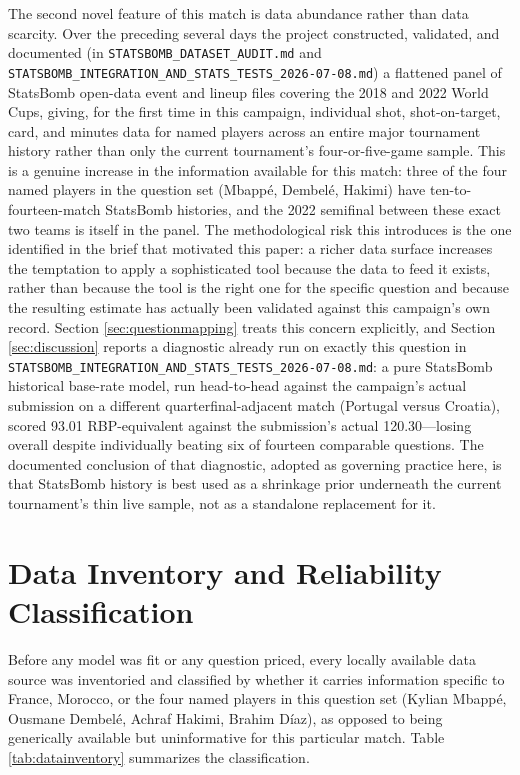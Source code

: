 \documentclass[11pt]{article}
\begin{document}
The second novel feature of this match is data abundance rather than data scarcity. Over
the preceding several days the project constructed, validated, and documented (in
\texttt{STATSBOMB\_DATASET\_AUDIT.md} and
\texttt{STATSBOMB\_INTEGRATION\_AND\_STATS\_TESTS\_2026-07-08.md}) a flattened panel of
StatsBomb open-data event and lineup files covering the 2018 and 2022 World Cups, giving,
for the first time in this campaign, individual shot, shot-on-target, card, and minutes
data for named players across an entire major tournament history rather than only the
current tournament's four-or-five-game sample. This is a genuine increase in the
information available for this match: three of the four named players in the question
set (Mbapp\'e, Dembel\'e, Hakimi) have ten-to-fourteen-match StatsBomb histories, and the
2022 semifinal between these exact two teams is itself in the panel. The methodological
risk this introduces is the one identified in the brief that motivated this paper: a
richer data surface increases the temptation to apply a sophisticated tool because the
data to feed it exists, rather than because the tool is the right one for the specific
question and because the resulting estimate has actually been validated against this
campaign's own record. Section \ref{sec:questionmapping} treats this concern explicitly,
and Section \ref{sec:discussion} reports a diagnostic already run on exactly this
question in \texttt{STATSBOMB\_INTEGRATION\_AND\_STATS\_TESTS\_2026-07-08.md}: a
pure StatsBomb historical base-rate model, run head-to-head against the campaign's actual
submission on a different quarterfinal-adjacent match (Portugal versus Croatia), scored
93.01 RBP-equivalent against the submission's actual 120.30---losing overall despite
individually beating six of fourteen comparable questions. The documented conclusion of
that diagnostic, adopted as governing practice here, is that StatsBomb history is best
used as a shrinkage prior underneath the current tournament's thin live sample, not as a
standalone replacement for it.

\section{Data Inventory and Reliability Classification}
\label{sec:data}

Before any model was fit or any question priced, every locally available data source was
inventoried and classified by whether it carries information specific to France, Morocco,
or the four named players in this question set (Kylian Mbapp\'e, Ousmane Dembel\'e,
Achraf Hakimi, Brahim D\'iaz), as opposed to being generically available but uninformative
for this particular match. Table \ref{tab:datainventory} summarizes the classification.
\end{document}
